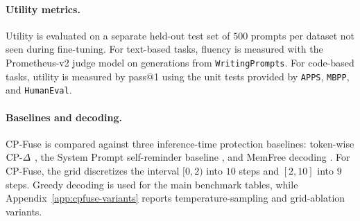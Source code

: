 \paragraph{Utility metrics.}
Utility is evaluated on a separate held-out test set of \(500\) prompts per dataset not seen during fine-tuning. For text-based tasks, fluency is measured with the Prometheus-v2 judge model \citep{kim2024prometheus} on generations from \texttt{WritingPrompts}. For code-based tasks, utility is measured by pass@1 \citep{chen2021evaluating} using the unit tests provided by \texttt{APPS}, \texttt{MBPP}, and \texttt{HumanEval}.

\paragraph{Baselines and decoding.}
CP-Fuse is compared against three inference-time protection baselines: token-wise \(\text{CP-}\Delta\) \citep{vyas2023provable}, the System Prompt self-reminder baseline \citep{xie2023defending}, and MemFree decoding \citep{ippolito2023preventing}. For CP-Fuse, the grid discretizes the interval \([0,2)\) into \(10\) steps and \([2,10]\) into \(9\) steps. Greedy decoding is used for the main benchmark tables, while Appendix~\ref{app:cpfuse-variants} reports temperature-sampling and grid-ablation variants.

